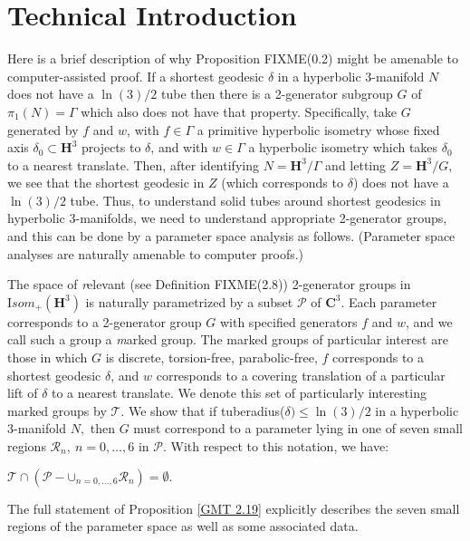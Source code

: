 \chapter{Technical Introduction}
Here is a brief description of why Proposition FIXME(0.2) might be amenable to 
computer-assisted proof.
If a shortest geodesic $\delta$ in a hyperbolic $3$-manifold $N$ does not have 
a $\ln(3)/2$
tube then there is a 2-generator subgroup $G$ of $\pi_1(N) = \Gamma$
which also does not have that property.
Specifically, take $G$ generated by $f$ and $w$,
with $f \in \Gamma$ a primitive hyperbolic isometry
whose fixed axis $\delta_0 \subset {\mathbf H}^3$ projects to $\delta$, and 
with $w \in \Gamma$ a hyperbolic isometry
which takes $\delta_0$ to a nearest translate.
Then, after identifying $N={\mathbf H}^3/\Gamma$ and letting 
$Z={\mathbf H}^3/G$,
we see that the shortest geodesic in $Z$ (which corresponds to $\delta$)
does not have 
a $\ln(3)/2$ tube. 
Thus, to understand solid tubes around shortest geodesics in hyperbolic 
$3$-manifolds, we need to understand appropriate 2-generator groups, and this 
can be done by a parameter space analysis as follows.  (Parameter space 
analyses are naturally amenable to 
computer proofs.)

The space of {\textit relevant} (see Definition FIXME(2.8)) 2-generator groups 
in ${\mathrm Isom}_+({\mathbf H}^3)$ is naturally
parametrized by a subset ${\mathcal P}$ of ${\mathbf C}^3.$  
Each parameter corresponds to a
2-generator group $G$ with specified generators $f$ and $w$, and we call 
such a group a {\textit marked group}. 
The marked groups of particular interest are those in which $G$ is
discrete, torsion-free, parabolic-free, $f$ corresponds to a shortest
geodesic $\delta$, and $w$ corresponds to a
covering translation of a particular lift of
$\delta$ to a nearest translate.  
We denote this set of particularly interesting marked groups by ${\mathcal T}.$
We show that if tuberadius($\delta) \le \ln(3)/2$ 
in a hyperbolic $3$-manifold $N,$ then 
$G$ must correspond to a parameter lying in one of seven small regions
${\mathcal R}_n,\ n=0,\ldots,6$ 
in ${\mathcal P}$.  
With respect to this notation, we have:

\begin{proposition} \label{GMT 2.19}
${\mathcal T} \cap ({\mathcal P} - \mathbf{\cup}_{n=0,\ldots,6}{\mathcal R}_n) = \emptyset.$
\vfill\end{proposition}

The full statement of Proposition \ref{GMT 2.19}
explicitly describes the seven small
regions of the parameter space as well as some associated data.

